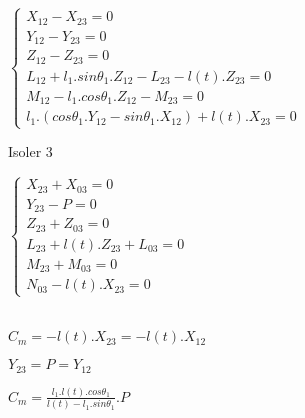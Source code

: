 $\left\{\begin{array}{l}
X_{12}-X_{23}=0 \\
Y_{12}-Y_{23}=0 \\
Z_{12}-Z_{23}=0 \\
L_{12}+l_1.sin\theta_1.Z_{12}-L_{23}-l(t).Z_{23}=0 \\
M_{12}-l_1.cos\theta_1.Z_{12}-M_{23}=0 \\
l_1.(cos\theta_1.Y_{12}-sin\theta_1.X_{12})+l(t).X_{23}=0
\end{array}\right.$

Isoler 3

$\left\{\begin{array}{l}
X_{23}+X_{03}=0 \\
Y_{23}-P=0 \\
Z_{23}+Z_{03}=0 \\
L_{23}+l(t).Z_{23}+L_{03}=0 \\
M_{23}+M_{03}=0 \\
N_{03}-l(t).X_{23}=0
\end{array}\right.$

~\ \\
$C_m=-l(t).X_{23}=-l(t).X_{12}$

$Y_{23}=P=Y_{12}$

$C_m=\frac{l_1.l(t).cos\theta_1}{l(t)-l_1.sin\theta_1}.P$

